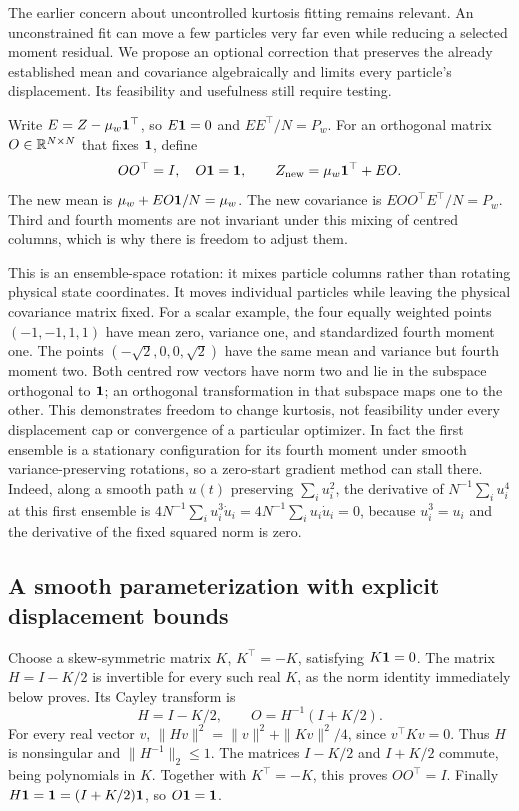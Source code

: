 The earlier concern about uncontrolled kurtosis fitting remains relevant.
An unconstrained fit can move a few particles very far even while reducing
a selected moment residual. We propose an optional correction that preserves
the already established mean and covariance algebraically and limits every
particle's displacement. Its feasibility and usefulness still require testing.

Write \(E=Z-\mu_w\mathbf 1^\top\), so \(E\mathbf 1=0\) and \(EE^\top/N=P_w\).
For an orthogonal matrix \(O\in\mathbb R^{N\times N}\) that fixes \(\mathbf 1\), define
\begin{equation}
\label{eq:bf-covariance-proposal-orthogonal-repair}
 OO^\top=I,\quad O\mathbf 1=\mathbf 1,\qquad
 Z_{\rm new}=\mu_w\mathbf 1^\top+EO.
\end{equation}
The new mean is \(\mu_w+EO\mathbf 1/N=\mu_w\).
The new covariance is \(EOO^\top E^\top/N=P_w\).
Third and fourth moments are not invariant under this mixing of centred
columns, which is why there is freedom to adjust them.

This is an ensemble-space rotation: it mixes particle columns rather than
rotating physical state coordinates. It moves individual particles while
leaving the physical covariance matrix fixed. For a scalar example, the
four equally weighted points \((-1,-1,1,1)\) have mean zero, variance one,
and standardized fourth moment one. The points
\((-\sqrt2,0,0,\sqrt2)\) have the same mean and variance but fourth moment
two. Both centred row vectors have norm two and lie in the subspace
orthogonal to \(\mathbf 1\); an orthogonal transformation in that subspace
maps one to the other. This demonstrates freedom to change kurtosis,
not feasibility under every displacement cap or convergence of a
particular optimizer. In fact the first ensemble is a stationary
configuration for its fourth moment under smooth variance-preserving
rotations, so a zero-start gradient method can stall there.
Indeed, along a smooth path \(u(t)\) preserving \(\sum_i u_i^2\),
the derivative of \(N^{-1}\sum_i u_i^4\) at this first ensemble is
\(4N^{-1}\sum_i u_i^3\dot u_i
=4N^{-1}\sum_i u_i\dot u_i=0\), because \(u_i^3=u_i\) and
the derivative of the fixed squared norm is zero.

\subsection{A smooth parameterization with explicit displacement bounds}

Choose a skew-symmetric matrix \(K\), \(K^\top=-K\), satisfying \(K\mathbf 1=0\).
The matrix \(H=I-K/2\) is invertible for every such real \(K\), as the
norm identity immediately below proves. Its Cayley transform is
\begin{equation}
\label{eq:bf-covariance-proposal-cayley}
 H=I-K/2,\qquad O=H^{-1}(I+K/2).
\end{equation}
For every real vector \(v\),
\(\|Hv\|^2=\|v\|^2+\|Kv\|^2/4\), since \(v^\top Kv=0\).
Thus \(H\) is nonsingular and \(\|H^{-1}\|_2\leq1\).
The matrices \(I-K/2\) and \(I+K/2\) commute, being polynomials in \(K\).
Together with \(K^\top=-K\), this proves \(OO^\top=I\).
Finally \(H\mathbf 1=\mathbf 1=(I+K/2)\mathbf 1\), so \(O\mathbf 1=\mathbf 1\).

